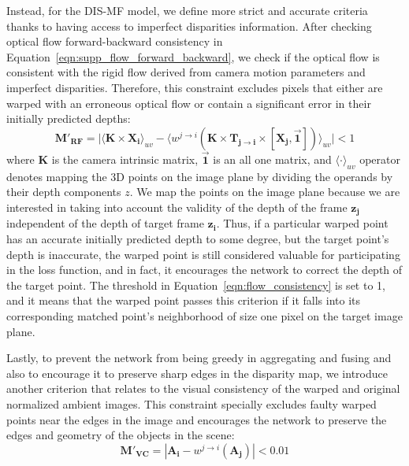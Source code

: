 Instead, for the DIS-MF model, we define more strict and accurate criteria thanks to having access to imperfect disparities information. After checking optical flow forward-backward consistency in Equation~\ref{eqn:supp_flow_forward_backward}, we check if the optical flow is consistent with the rigid flow derived from camera motion parameters and imperfect disparities. Therefore, this constraint excludes pixels that either are warped with an erroneous optical flow or contain a significant error in their initially predicted depths:
\begin{equation}\label{eqn:flow_consistency}
    \boldsymbol{M'_{RF}} = \Big|\langle \boldsymbol{K} \times \boldsymbol{X_{i}}\rangle_{uv} - \big\langle w^{j \rightarrow i}
    (\boldsymbol{K} \times \boldsymbol{T_{j \rightarrow i}} \times [\boldsymbol{X_{j}},\vec{\mathbf{1}}])\big\rangle_{uv}   \Big| < 1
\end{equation}
where $\boldsymbol{K}$ is the camera intrinsic matrix, $\vec{\mathbf{1}}$ is an all one matrix, and $\langle\cdot\rangle_{uv}$ operator denotes mapping the 3D points on the image plane by dividing the operands by their depth components $z$. We map the points on the image plane because we are interested in taking into account the validity of the depth of the frame $\boldsymbol{z_j}$ independent of the depth of target frame $\boldsymbol{z_i}$. Thus, if a particular warped point has an accurate initially predicted depth to some degree, but the target point's depth is inaccurate, the warped point is still considered valuable for participating in the loss function, and in fact, it encourages the network to correct the depth of the target point. The threshold in Equation~\ref{eqn:flow_consistency} is set to 1, and it means that the warped point passes this criterion if it falls into its corresponding matched point's neighborhood of size one pixel on the target image plane.

Lastly, to prevent the network from being greedy in aggregating and fusing and also to encourage it to preserve sharp edges in the disparity map, we introduce another criterion that relates to the visual consistency of the warped and original normalized ambient images. This constraint specially excludes faulty warped points near the edges in the image and encourages the network to preserve the edges and geometry of the objects in the scene:
\begin{equation}\label{eqn:ambient_warp_check}
    \boldsymbol{M'_{VC}} = |\boldsymbol{A_{i}} - w^{j \rightarrow i}(\boldsymbol{A_{j}})|< 0.01
\end{equation}

